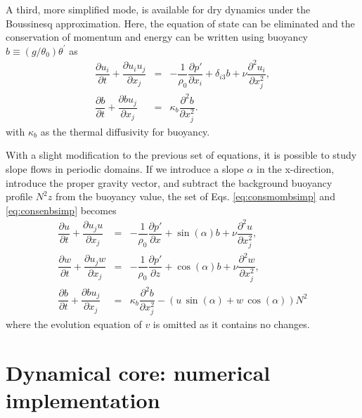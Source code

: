 \documentclass[gmd]{copernicus}
\begin{document}
A third, more simplified mode, is available for dry dynamics under the Boussinesq approximation. Here, the equation of state can be eliminated and the conservation of momentum and energy can be written using buoyancy $b \equiv (g/\theta_0)\theta^\prime$ as
\begin{eqnarray}
\dfrac{\partial u_i}{\partial t} + \dfrac{\partial u_i u_j}{\partial x_j} & = & 
- \dfrac{1}{\rho_0}\dfrac{\partial p'}{\partial x_i} + \delta_{i3} b + \nu \dfrac{\partial^2 u_i}{\partial x_j^2}\label{eq:consmombsimp},\\
\dfrac{\partial b}{\partial t} + \dfrac{\partial b u_j}{\partial x_j} & = & 
\kappa_b \dfrac{\partial^2 b}{\partial x_j^2}\label{eq:consenbsimp}.
\end{eqnarray}
with $\kappa_b$ as the thermal diffusivity for buoyancy.

With a slight modification to the previous set of equations, it is possible to study slope flows in periodic domains. If we introduce a slope $\alpha$ in the x-direction, introduce the proper gravity vector, and subtract the background buoyancy profile $N^2 z$ from the buoyancy value, the set of Eqs. \ref{eq:consmombsimp} and \ref{eq:consenbsimp} becomes
\begin{eqnarray}
\dfrac{\partial u}{\partial t} + \dfrac{\partial u_j u}{\partial x_j} & = & 
- \dfrac{1}{\rho_0}\dfrac{\partial p'}{\partial x} + \sin(\alpha) b + \nu \dfrac{\partial^2 u}{\partial x_j^2}\label{eq:consuslope},\\
\dfrac{\partial w}{\partial t} + \dfrac{\partial u_j w}{\partial x_j} & = & 
- \dfrac{1}{\rho_0}\dfrac{\partial p'}{\partial z} + \cos(\alpha) b + \nu \dfrac{\partial^2 w}{\partial x_j^2}\label{eq:conswslope},\\
\dfrac{\partial b}{\partial t} + \dfrac{\partial b u_j}{\partial x_j} & = & 
\kappa_b \dfrac{\partial^2 b}{\partial x_j^2} - \left (u\,\sin(\alpha) + w\,\cos(\alpha) \right) N^2\label{eq:consbslope}
\end{eqnarray}
where the evolution equation of $v$ is omitted as it contains no changes.

\section{Dynamical core: numerical implementation}\label{sec:dyncorediscrete}
\end{document}
